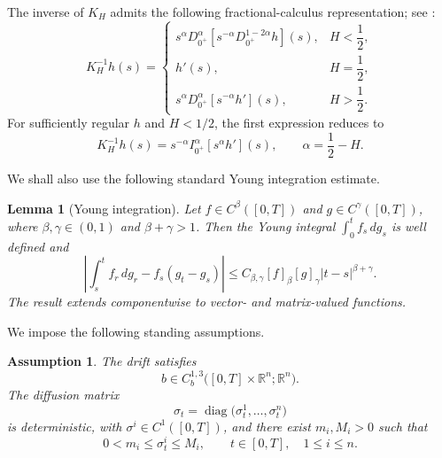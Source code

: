 \documentclass[preprint,12pt]{elsarticle}
\newtheorem{lemma}[theorem]{Lemma}
\theoremstyle{definition}
\theoremstyle{plain}
\newtheorem{assumption}[theorem]{Assumption}
\begin{document}
The inverse of $K_H$ admits the following fractional-calculus
representation; see \cite[Lemma~10]{Nualart}:
\begin{equation}
\label{eq:KH_inverse}
    K_H^{-1}h(s)
    =
    \begin{cases}
        \displaystyle
        s^\alpha D_{0^+}^\alpha
        \left[
            s^{-\alpha}D_{0^+}^{1-2\alpha}h
        \right](s),
        & H<\dfrac12,
        \\[2.5ex]
        \displaystyle
        h'(s),
        & H=\dfrac12,
        \\[2.5ex]
        \displaystyle
        s^\alpha D_{0^+}^\alpha
        \left[
            s^{-\alpha}h'
        \right](s),
        & H>\dfrac12.
    \end{cases}
\end{equation}
For sufficiently regular $h$ and $H<1/2$, the first expression reduces to
\begin{equation}
\label{eq:KH_inverse_H_less_half_smooth}
    K_H^{-1}h(s)
    =
    s^{-\alpha}
    I_{0^+}^\alpha
    \left[
        s^\alpha h'
    \right](s),
    \qquad
    \alpha=\frac12-H.
\end{equation}

We shall also use the following standard Young integration estimate.

\begin{lemma}[Young integration]
\label{lem:young-integration}
Let $f\in C^\beta([0,T])$ and $g\in C^\gamma([0,T])$, where
$\beta,\gamma\in(0,1)$ and $\beta+\gamma>1$. Then the Young integral
$\int_0^t f_s\,dg_s$ is well defined and
\begin{equation}
\label{eq:young-loeve-estimate}
    \left|
        \int_s^t f_r\,dg_r
        -
        f_s(g_t-g_s)
    \right|
    \leq
    C_{\beta,\gamma}
    [f]_\beta[g]_\gamma
    |t-s|^{\beta+\gamma}.
\end{equation}
The result extends componentwise to vector- and matrix-valued functions.
\end{lemma}

We impose the following standing assumptions.

\begin{assumption}
\label{ass:A}
The drift satisfies
\begin{equation*}
    b\in
    C_b^{1,3}
    \bigl([0,T]\times\mathbb R^n;\mathbb R^n\bigr).
\end{equation*}
The diffusion matrix
\begin{equation*}
    \sigma_t
    =
    \operatorname{diag}
    \bigl(\sigma_t^1,\ldots,\sigma_t^n\bigr)
\end{equation*}
is deterministic, with $\sigma^i\in C^1([0,T])$, and there exist
$m_i,M_i>0$ such that
\begin{equation*}
    0<m_i\leq\sigma_t^i\leq M_i,
    \qquad
    t\in[0,T],
    \quad
    1\leq i\leq n.
\end{equation*}
\end{assumption}
\end{document}
